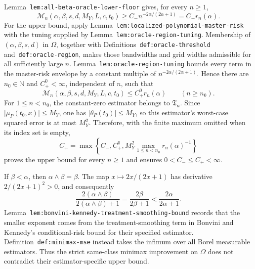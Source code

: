 Lemma~\texttt{lem:all-beta-oracle-lower-floor} gives, for every \(n\ge1\),
\[
\mathcal M_n(\alpha,\beta,s,d,M_Y,L,c,t_0)
\ge C_-n^{-2\alpha/(2\alpha+1)}=C_-r_n(\alpha).
\]
For the upper bound, apply Lemma~\texttt{lem:localized-polynomial-master-risk} with the tuning supplied by Lemma~\texttt{lem:oracle-region-tuning}. Membership of \((\alpha,\beta,s,d)\) in \(\Omega\), together with Definitions~\texttt{def:oracle-threshold} and~\texttt{def:oracle-region}, makes those bandwidths and grid widths admissible for all sufficiently large \(n\). Lemma~\texttt{lem:oracle-region-tuning} bounds every term in the master-risk envelope by a constant multiple of \(n^{-2\alpha/(2\alpha+1)}\). Hence there are \(n_0\in\mathbb N\) and \(C_+^0<\infty\), independent of \(n\), such that
\[
\mathcal M_n(\alpha,\beta,s,d,M_Y,L,c,t_0)
\le C_+^0r_n(\alpha)
\qquad(n\ge n_0).
\]
For \(1\le n<n_0\), the constant-zero estimator belongs to \(\mathfrak T_n\). Since \(\lvert\mu_P(t_0,x)\rvert\le M_Y\), one has \(\lvert\theta_P(t_0)\rvert\le M_Y\), so this estimator's worst-case squared error is at most \(M_Y^2\). Therefore, with the finite maximum omitted when its index set is empty,
\[
C_+=\max\left\{C_-,C_+^0,
M_Y^2\max_{1\le n<n_0}r_n(\alpha)^{-1}\right\}
\]
proves the upper bound for every \(n\ge1\) and ensures \(0<C_-\le C_+<\infty\).

If \(\beta<\alpha\), then \(\alpha\wedge\beta=\beta\). The map \(x\mapsto2x/(2x+1)\) has derivative \(2/(2x+1)^2>0\), and consequently
\[
\frac{2(\alpha\wedge\beta)}{2(\alpha\wedge\beta)+1}
=
\frac{2\beta}{2\beta+1}
<
\frac{2\alpha}{2\alpha+1}.
\]
Lemma~\texttt{lem:bonvini-kennedy-treatment-smoothing-bound} records that the smaller exponent comes from the treatment-smoothing term in Bonvini and Kennedy's conditional-risk bound for their specified estimator. Definition~\texttt{def:minimax-mse} instead takes the infimum over all Borel measurable estimators. Thus the strict same-class minimax improvement on \(\Omega\) does not contradict their estimator-specific upper bound.